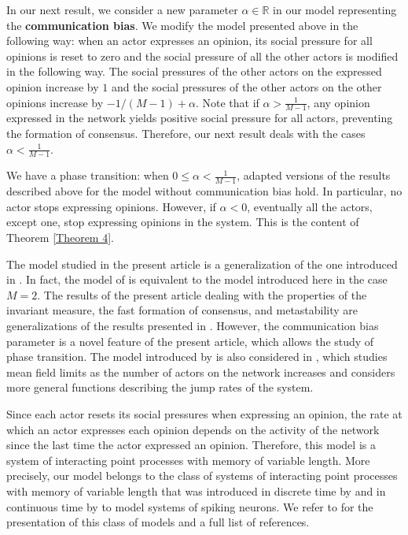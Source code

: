 \documentclass[11pt]{article}
\theoremstyle{definition}
\begin{document}
In our next result, we consider a new parameter $\alpha\in\mathbb{R}$ in our model representing the \textbf{communication bias}. We modify the model presented above in the following way: when an actor expresses an opinion, its social pressure for all opinions is reset to zero and the social pressure of all the other actors is modified in the following way. 
The social pressures of the other actors on the expressed opinion increase by $1$ and the social pressures of the other actors on the other opinions increase by $-1/(M-1)+\alpha$. Note that if $\alpha> \frac{1}{M-1}$, any opinion expressed in the network yields positive social pressure for all actors, preventing the formation of consensus. Therefore, our next result deals with the cases $\alpha < \frac{1}{M-1}$.

We have a phase transition: when $0\leq \alpha< \frac{1}{M-1}$, adapted versions of the results described above for the model without communication bias hold. In particular, no actor stops expressing opinions. However, if $\alpha< 0$, eventually all the actors, except one, stop expressing opinions in the system. This is the content of Theorem \ref{Theorem 4}.

The model studied in the present article is a generalization of the one introduced in \cite{galves2024fastconsensusmetastabilityhighly}. In fact, the model of \cite{galves2024fastconsensusmetastabilityhighly} is equivalent to the model introduced here in the case $M=2$. The results of the present article dealing with the properties of the invariant measure, the fast formation of consensus, and metastability are generalizations of the results presented in \cite{galves2024fastconsensusmetastabilityhighly}. However, the communication bias parameter is a novel feature of the present article, which allows the study of phase transition. The model  introduced by \cite{galves2024fastconsensusmetastabilityhighly} is also considered in \cite{evalaxa}, which studies mean field limits as the number of actors on the network increases and considers more general functions describing the jump rates of the system.

Since each actor resets its social pressures when expressing an opinion, the rate at which an actor expresses each opinion depends on the activity of the network since the last time the actor expressed an opinion. Therefore, this model is a system of interacting point processes with memory of variable length. More precisely,
our model belongs to the  class of systems of interacting point processes with memory of variable length that was introduced in discrete time by \cite{glmodel} and in continuous time by \cite{gl4} to model systems of spiking neurons. We refer to \cite{gb} for the presentation of this class of models and a full list of references.  
\end{document}
